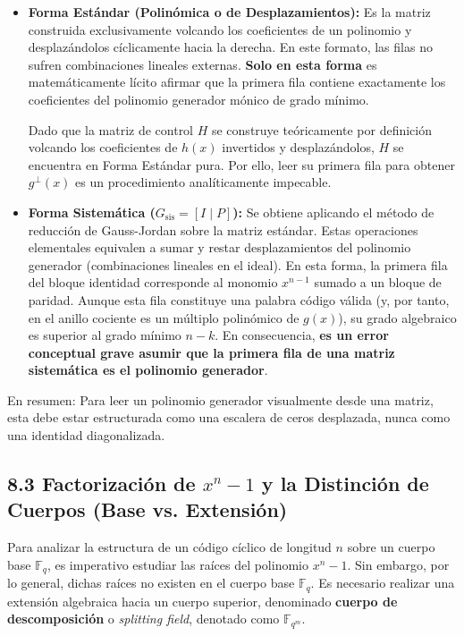 \documentclass{article}
\begin{document}
\begin{itemize}
    \item \textbf{Forma Estándar (Polinómica o de Desplazamientos):} 
    Es la matriz construida exclusivamente volcando los coeficientes de un polinomio y desplazándolos cíclicamente hacia la derecha. En este formato, las filas no sufren combinaciones lineales externas. \textbf{Solo en esta forma} es matemáticamente lícito afirmar que la primera fila contiene exactamente los coeficientes del polinomio generador mónico de grado mínimo. 
    
    Dado que la matriz de control $H$ se construye teóricamente por definición volcando los coeficientes de $h(x)$ invertidos y desplazándolos, $H$ se encuentra en Forma Estándar pura. Por ello, leer su primera fila para obtener $g^\perp(x)$ es un procedimiento analíticamente impecable.

    \item \textbf{Forma Sistemática ($G_{\text{sis}} = [I \mid P]$):}
    Se obtiene aplicando el método de reducción de Gauss-Jordan sobre la matriz estándar. Estas operaciones elementales equivalen a sumar y restar desplazamientos del polinomio generador (combinaciones lineales en el ideal). 
    En esta forma, la primera fila del bloque identidad corresponde al monomio $x^{n-1}$ sumado a un bloque de paridad. Aunque esta fila constituye una palabra código válida (y, por tanto, en el anillo cociente es un múltiplo polinómico de $g(x)$), su grado algebraico es superior al grado mínimo $n-k$. En consecuencia, \textbf{es un error conceptual grave asumir que la primera fila de una matriz sistemática es el polinomio generador}.
\end{itemize}

En resumen: Para leer un polinomio generador visualmente desde una matriz, esta debe estar estructurada como una escalera de ceros desplazada, nunca como una identidad diagonalizada.

\subsection{8.3 Factorización de $x^n-1$ y la Distinción de Cuerpos (Base vs. Extensión)}

Para analizar la estructura de un código cíclico de longitud $n$ sobre un cuerpo base $\mathbb{F}_q$, es imperativo estudiar las raíces del polinomio $x^n - 1$. Sin embargo, por lo general, dichas raíces no existen en el cuerpo base $\mathbb{F}_q$. Es necesario realizar una extensión algebraica hacia un cuerpo superior, denominado \textbf{cuerpo de descomposición} o \textit{splitting field}, denotado como $\mathbb{F}_{q^m}$.
\end{document}
